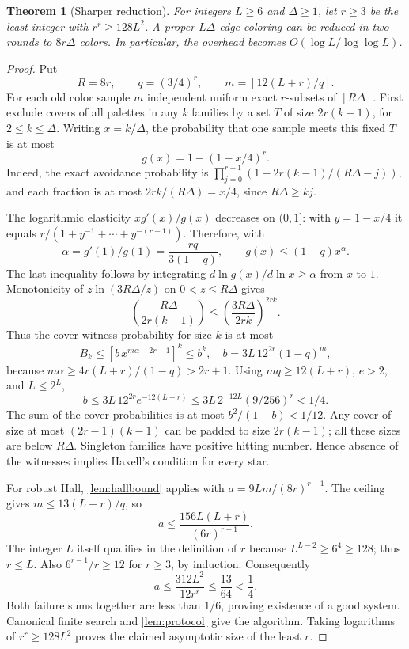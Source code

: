 \documentclass[11pt]{article}
\newtheorem{theorem}{Theorem}[section]
\theoremstyle{definition}
\theoremstyle{remark}
\newcommand{\ceil}[1]{\left\lceil #1\right\rceil}
\begin{document}
\begin{theorem}[Sharper reduction]\label{thm:sharp}
For integers $L\ge6$ and $\Delta\ge1$, let $r\ge3$ be the least
integer with $r^r\ge128L^2$. A proper $L\Delta$-edge coloring can be
reduced in two rounds to $8r\Delta$ colors. In particular, the overhead
becomes $O(\log L/\log\log L)$.
\end{theorem}
\begin{proof}
Put
\[
 R=8r,\qquad q=(3/4)^r,\qquad
 m=\ceil{12(L+r)/q}.
\]
For each old color sample $m$ independent uniform exact $r$-subsets of
$[R\Delta]$. First exclude covers of all palettes in any $k$ families
by a set $T$ of size $2r(k-1)$, for $2\le k\le\Delta$.
Writing $x=k/\Delta$, the probability that one sample meets this fixed
$T$ is at most
\[
 g(x)=1-(1-x/4)^r.
\]
Indeed, the exact avoidance probability is
$\prod_{j=0}^{r-1}(1-2r(k-1)/(R\Delta-j))$, and each fraction is at
most $2rk/(R\Delta)=x/4$, since $R\Delta\ge kj$.

The logarithmic elasticity $xg'(x)/g(x)$ decreases on $(0,1]$:
with $y=1-x/4$ it equals
$r/(1+y^{-1}+\cdots+y^{-(r-1)})$. Therefore, with
\[
 \alpha=g'(1)/g(1)=\frac{rq}{3(1-q)},
 \qquad g(x)\le(1-q)x^\alpha.
\]
The last inequality follows by integrating
$d\ln g(x)/d\ln x\ge\alpha$ from $x$ to $1$.
Monotonicity of $z\ln(3R\Delta/z)$ on $0<z\le R\Delta$ gives
\[
 \binom{R\Delta}{2r(k-1)}
 \le\left(\frac{3R\Delta}{2rk}\right)^{2rk}.
\]
Thus the cover-witness probability for size $k$ is at most
\[
 B_k\le[b\,x^{m\alpha-2r-1}]^k\le b^k,
 \quad b=3L\,12^{2r}(1-q)^m,
\]
because $m\alpha\ge4r(L+r)/(1-q)>2r+1$.
Using $mq\ge12(L+r)$, $e>2$, and $L\le2^L$,
\[
 b\le3L\,12^{2r}e^{-12(L+r)}
 \le3L\,2^{-12L}(9/256)^r<1/4.
\]
The sum of the cover probabilities is at most $b^2/(1-b)<1/12$.
Any cover of size at most $(2r-1)(k-1)$ can be padded to size
$2r(k-1)$; all these sizes are below $R\Delta$. Singleton families
have positive hitting number. Hence absence of the witnesses implies
Haxell's condition for every star.

For robust Hall, \cref{lem:hallbound} applies with
$a=9Lm/(8r)^{r-1}$. The ceiling gives $m\le13(L+r)/q$, so
\[
 a\le\frac{156L(L+r)}{(6r)^{r-1}}.
\]
The integer $L$ itself qualifies in the definition of $r$ because
$L^{L-2}\ge6^4\ge128$; thus $r\le L$.
Also $6^{r-1}/r\ge12$ for $r\ge3$, by induction. Consequently
\[
 a\le\frac{312L^2}{12r^r}\le\frac{13}{64}<\frac14.
\]
Both failure sums together are less than $1/6$, proving existence of
a good system. Canonical finite search and \cref{lem:protocol} give
the algorithm. Taking logarithms of $r^r\ge128L^2$ proves the claimed
asymptotic size of the least $r$.
\end{proof}
\end{document}
